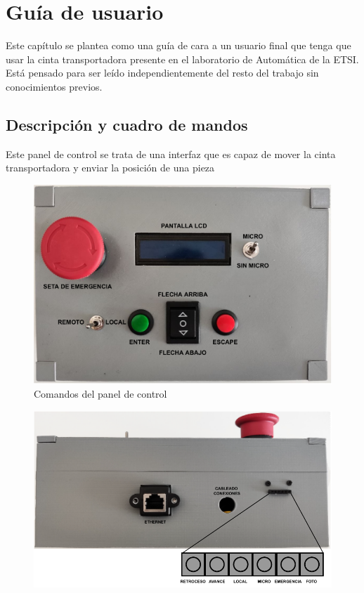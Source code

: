 \chapter{Guía de usuario}

Este capítulo se plantea como una guía de cara a un usuario final que tenga que usar la cinta transportadora presente en el laboratorio de Automática de la ETSI. Está pensado para ser leído independientemente del resto del trabajo sin conocimientos previos.

\section{Descripción y cuadro de mandos}

Este panel de control se trata de una interfaz que es capaz de mover la cinta transportadora y enviar la posición de una pieza 

\begin{figure}[htbp]
	\centering
	\includegraphics[width=\textwidth]{09-guiadeuso/HMI_REAL.pdf}
	\caption{Comandos del panel de control}
	\label{fig:interfazhmireal}
	\end{figure}



    \begin{figure}[htbp]
        \centering
        \includegraphics[width=\textwidth]{09-guiadeuso/DIGITALES_REAL.pdf}
        \caption{}
        \label{fig:pinesdigitalesreal}
        \end{figure}

